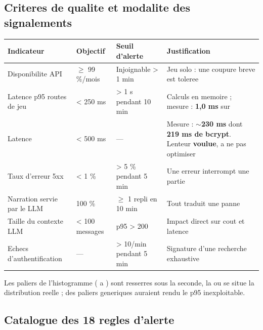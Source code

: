 \subsection{Criteres de qualite et modalite des signalements}

\footnotesize
\begin{tabularx}{\linewidth}{@{}L{3.6cm} L{1.7cm} L{2.4cm} X@{}}
\toprule
\textbf{Indicateur} & \textbf{Objectif} & \textbf{Seuil d'alerte} & \textbf{Justification} \\
\midrule
Disponibilite API & $\geq$ 99 \%/mois & Injoignable > 1 min & Jeu solo : une coupure breve est toleree \\
Latence p95 routes de jeu & < 250 ms & > 1 s pendant 10 min & Calculs en memoire ; mesure : \textbf{1,0 ms} sur  \\
Latence  & < 500 ms & --- & Mesure : \textbf{$\sim$230 ms} dont \textbf{219 ms de bcrypt}. Lenteur \textbf{voulue}, a ne pas optimiser \\
Taux d'erreur 5xx & < 1 \% & > 5 \% pendant 5 min & Une erreur interrompt une partie \\
Narration servie par le LLM & 100 \% & $\geq$ 1 repli en 10 min & Tout  traduit une panne \\
Taille du contexte LLM & < 100 messages & p95 > 200 & Impact direct sur cout et latence \\
Echecs d'authentification & --- & > 10/min pendant 5 min & Signature d'une recherche exhaustive \\
\bottomrule
\end{tabularx}
\normalsize

\vspace{3pt}
Les paliers de l'histogramme ( a ) sont resserres sous la seconde, la ou se
situe la distribution reelle ; des paliers generiques auraient rendu le p95 inexploitable.

\subsection{Catalogue des 18 regles d'alerte}

